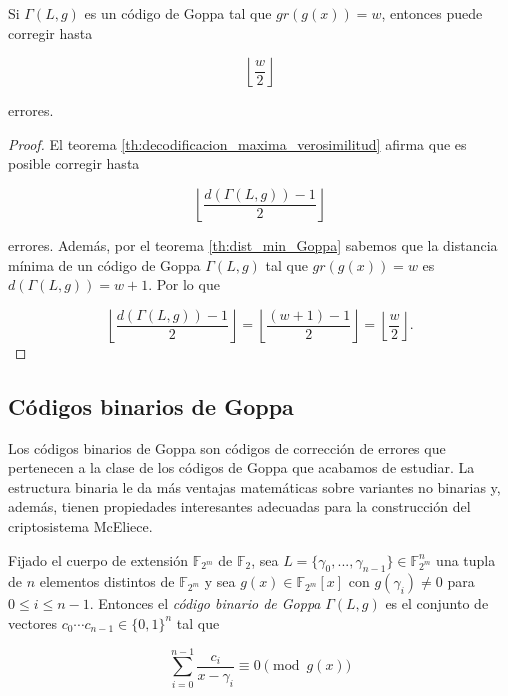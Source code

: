 \begin{corollary}
    Si $\Gamma(L,g)$ es un código de Goppa tal que $gr(g(x)) = w$, entonces puede corregir hasta

    $$\left\lfloor \frac{w}{2} \right\rfloor $$

    errores.
\end{corollary}

\begin{proof}
    El teorema \ref{th:decodificacion_maxima_verosimilitud} afirma que es posible corregir hasta 
    
    $$\left\lfloor \frac{d(\Gamma(L,g)) - 1}{2} \right\rfloor$$

    errores. Además, por el teorema \ref{th:dist_min_Goppa} sabemos que la distancia mínima de un código de Goppa $\Gamma(L,g)$ tal que $gr(g(x)) = w$ es $d(\Gamma(L,g)) = w + 1$. Por lo que

    $$\left\lfloor \frac{d(\Gamma(L,g)) - 1}{2} \right\rfloor = \left\lfloor \frac{(w + 1) - 1}{2} \right\rfloor = \left\lfloor \frac{w}{2} \right\rfloor .$$
\end{proof}

\subsection{Códigos binarios de Goppa}

Los códigos binarios de Goppa son códigos de corrección de errores que pertenecen a la clase de los códigos de Goppa que acabamos de estudiar. La estructura binaria le da más ventajas matemáticas sobre variantes no binarias y, además, tienen propiedades interesantes adecuadas para la construcción del criptosistema McEliece.

\begin{definition}

    Fijado el cuerpo de extensión $\mathbb{F}_{2^m}$ de $\mathbb{F}_2$, sea $L = \{ \gamma_0, ..., \gamma_{n-1} \} \in \mathbb{F}_{2^m}^n$ una tupla de $n$ elementos distintos de $\mathbb{F}_{2^m}$ y sea $g(x) \in \mathbb{F}_{2^m}[x]$ con $g(\gamma_i) \neq 0$ para $0 \leq i \leq n - 1$. Entonces el \emph{código binario de Goppa} $\Gamma(L,g)$ es el conjunto de vectores $c_0 \cdots c_{n-1} \in \{ 0, 1 \}^n$ tal que 

    \begin{equation}
        \sum_{i=0}^{n-1} \frac{c_i}{x - \gamma_i} \equiv 0 \pmod{g(x)}
    \end{equation}
\end{definition}

